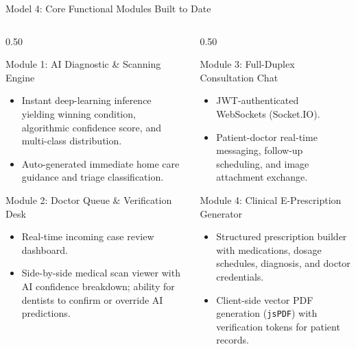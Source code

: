 \documentclass[aspectratio=169, 10pt]{beamer}
\begin{document}
\begin{frame}{Model 4: Core Functional Modules Built to Date}
\begin{columns}[T]
    \begin{column}{0.50\textwidth}
        \begin{block}{Module 1: AI Diagnostic \& Scanning Engine}
            \footnotesize
            \begin{itemize}
                \item Instant deep-learning inference yielding winning condition, algorithmic confidence score, and multi-class distribution.
                \item Auto-generated immediate home care guidance and triage classification.
            \end{itemize}
        \end{block}
        \begin{block}{Module 2: Doctor Queue \& Verification Desk}
            \footnotesize
            \begin{itemize}
                \item Real-time incoming case review dashboard.
                \item Side-by-side medical scan viewer with AI confidence breakdown; ability for dentists to confirm or override AI predictions.
            \end{itemize}
        \end{block}
    \end{column}
    \begin{column}{0.50\textwidth}
        \begin{block}{Module 3: Full-Duplex Consultation Chat}
            \footnotesize
            \begin{itemize}
                \item JWT-authenticated WebSockets (Socket.IO).
                \item Patient-doctor real-time messaging, follow-up scheduling, and image attachment exchange.
            \end{itemize}
        \end{block}
        \begin{block}{Module 4: Clinical E-Prescription Generator}
            \footnotesize
            \begin{itemize}
                \item Structured prescription builder with medications, dosage schedules, diagnosis, and doctor credentials.
                \item Client-side vector PDF generation (\texttt{jsPDF}) with verification tokens for patient records.
            \end{itemize}
        \end{block}
    \end{column}
\end{columns}
\end{frame}
\end{document}
